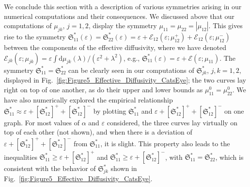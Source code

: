 \documentclass[english,12pt,jmp,graphicx]{revtex4-1}
\newcommand{\secref}[1]{Section~\ref{#1}}
\newcommand{\figref}[1]{Fig.~\ref{#1}}
\newcommand{\Sg}{\mathfrak{S}}
\renewcommand{\d}{\mathrm{d}}
\newcommand{\Ec}{\mathcal{E}}
\begin{document}
We conclude this section with a description of various symmetries
arising in our numerical computations and their consequences.
We discussed above that our computations of $\mu_{jk}$, 
$j=1,2$, display the symmetry $\mu_{11}=\mu_{22}=|\mu_{12}|$.
This gives rise to the symmetry
$\Sg^*_{11}(\varepsilon)=\Sg^*_{22}(\varepsilon)=\varepsilon
+\Ec_{12}(\varepsilon;\mu_{12}^+)+\Ec_{12}(\varepsilon;\mu_{12}^-)$ between
the components of the effective diffusivity, where we have denoted 
$\Ec_{jk}(\varepsilon;\mu_{jk})=\varepsilon\int\d\mu_{jk}(\lambda)/(\varepsilon^2+\lambda^2)$, 
e.g.,
$\Sg^*_{11}(\varepsilon)=\varepsilon+\Ec(\varepsilon;\mu_{11})$. The 
symmetry $\Sg^*_{11}=\Sg^*_{22}$ can be clearly seen in our
computations of $\Sg^*_{jk}$, $j,k=1,2$, displayed in
\figref{fig:Figure5_Effective_Diffusivity_CatsEye}; the two curves lay 
right on top of one another, as do their upper and lower bounds as
$\mu^0_{11}=\mu^0_{22}$. We have also numerically explored the 
empirical relationship
$\Sg^*_{11}\approx\varepsilon+[\Sg^*_{12}]^++[\Sg^*_{12}]^-$ 
by plotting $\Sg^*_{11}$
and $\varepsilon+[\Sg^*_{12}]^++[\Sg^*_{12}]^-$ on
one graph. For most values of $\alpha$ and $\varepsilon$ considered, the three curves
lay virtually on top of each other (not shown), and when there is
a deviation of $\varepsilon+[\Sg^*_{12}]^++[\Sg^*_{12}]^-$ from $\Sg^*_{11}$,
it is slight. This property also leads to the inequalities
$\Sg^*_{11}\geq\varepsilon+[\Sg^*_{12}]^+$ and
$\Sg^*_{11}\geq\varepsilon+[\Sg^*_{12}]^-$, with
$\Sg^*_{11}=\Sg^*_{22}$, which is consistent with the behavior of
$\Sg^*_{jk}$  shown in
\figref{fig:Figure5_Effective_Diffusivity_CatsEye}. 







\end{document}
